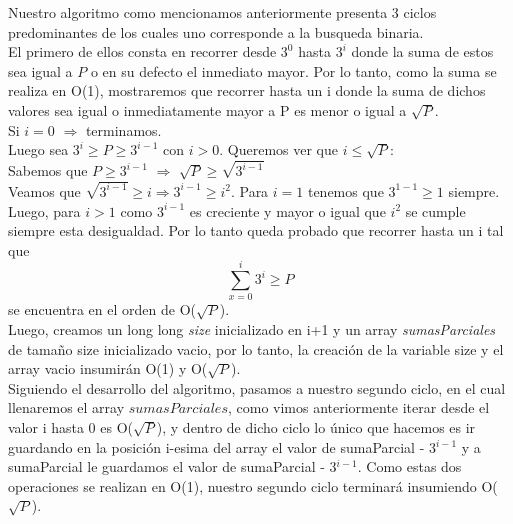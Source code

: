 
Nuestro algoritmo como mencionamos anteriormente presenta 3 ciclos predominantes de los cuales uno corresponde a la busqueda binaria.\\
El primero de ellos consta en recorrer desde $3^0$ hasta $3^i$ donde la suma de estos sea igual a $P$ o en su defecto el inmediato mayor. Por lo tanto, como la suma se realiza en O(1), mostraremos que recorrer hasta un i donde la suma de dichos valores sea igual o inmediatamente mayor a P es menor o igual a $\sqrt{P}$.\\

Si $i = 0$ $\Rightarrow$ terminamos.\\
Luego sea $3^i \geq P \geq 3^{i-1}$ con $i > 0$. Queremos ver que $i \leq \sqrt{P}$:\\
Sabemos que $P \geq 3^{i-1}$ $\Rightarrow$ $\sqrt{P} \geq \sqrt{3^{i-1}}$\\
Veamos que $\sqrt{3^{i-1}} \geq i \Rightarrow 3^{i-1} \geq {i^2}$. Para $i = 1$ tenemos que $3^{1-1} \geq 1$ siempre. Luego, para $i > 1$ como ${3^{i-1}}$ es creciente y mayor o igual que $i^2$ se cumple siempre esta desigualdad. Por lo tanto queda probado que recorrer hasta un i tal que \[
\sum_{x=0}^{i}3^{i} \geq P \] se encuentra en el orden de  O($\sqrt{P}$).\\

 Luego, creamos un long long \textit{size} inicializado en i+1 y un array \textit{sumasParciales} de tamaño size inicializado vacio, por lo tanto, la creaci\'on de la variable size y el array vacio insumir\'an O(1) y O($\sqrt{P}$).\\
 
Siguiendo el desarrollo del algoritmo, pasamos a nuestro segundo ciclo, en el cual llenaremos el array $sumasParciales$, como vimos anteriormente iterar desde el valor i hasta 0 es O($\sqrt{P}$), y dentro de dicho ciclo lo \'unico que hacemos es ir guardando en la posici\'on i-esima del array el valor de sumaParcial - 3$^{i-1}$ y a sumaParcial le guardamos el valor de sumaParcial - 3$^{i-1}$. Como estas dos operaciones se realizan en O(1), nuestro segundo ciclo terminar\'a insumiendo O($\sqrt{P}$).\\

